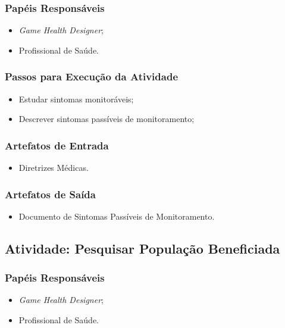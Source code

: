 \subsubsection{Papéis Responsáveis}
\begin{itemize}
	\item \textit{Game Health Designer};
	\item Profissional de Saúde.
\end{itemize}

\subsubsection{Passos para Execução da Atividade}
\begin{itemize}
	\item Estudar sintomas monitoráveis;
	\item Descrever sintomas passíveis de monitoramento;
\end{itemize}

\subsubsection{Artefatos de Entrada}
\begin{itemize}
	\item Diretrizes Médicas.
\end{itemize}

\subsubsection{Artefatos de Saída}
\begin{itemize}
	\item Documento de Sintomas Passíveis de Monitoramento.
\end{itemize}


\subsection{Atividade: Pesquisar População Beneficiada}
\subsubsection{Papéis Responsáveis}
\begin{itemize}
	\item \textit{Game Health Designer};
	\item Profissional de Saúde.
\end{itemize}

